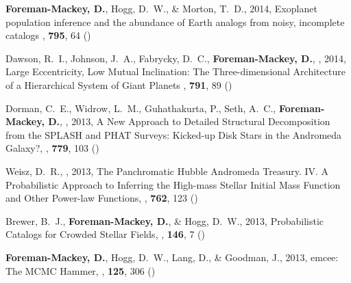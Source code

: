 \item {\bf Foreman-Mackey, D.}, Hogg, D.~W., \& Morton, T.~D., 2014,
        {Exoplanet population inference and the abundance of Earth analogs
         from noisy, incomplete catalogs}
    \apj, \textbf{795}, 64 ()

\item Dawson, R.~I., Johnson,  J.~A., Fabrycky, D.~C.,
    {\bf Foreman-Mackey, D.}, \etal, 2014,
        {Large Eccentricity, Low Mutual Inclination: The Three-dimensional
         Architecture of a Hierarchical System of Giant Planets}
    \apj, \textbf{791}, 89 ()

\item Dorman, C.~E., Widrow, L.~M., Guhathakurta, P., Seth, A.~C.,
    {\bf Foreman-Mackey, D.}, \etal, 2013,
        {A New Approach to Detailed Structural Decomposition from the SPLASH
         and PHAT Surveys: Kicked-up Disk Stars in the Andromeda Galaxy?},
    \apj, \textbf{779}, 103 ()

\item Weisz, D.~R., \etal, 2013,
        {The Panchromatic Hubble Andromeda Treasury. IV. A Probabilistic
         Approach to Inferring the High-mass Stellar Initial Mass Function and
         Other Power-law Functions},
    \apj, \textbf{762}, 123 ()

\item Brewer, B.~J., {\bf Foreman-Mackey, D.}, \& Hogg, D.~W., 2013,
        {Probabilistic Catalogs for Crowded Stellar Fields},
    \aj, \textbf{146}, 7 ()

\item {\bf Foreman-Mackey, D.}, Hogg, D.~W., Lang, D., \& Goodman, J., 2013,
        {emcee: The MCMC Hammer},
    \pasp, \textbf{125}, 306 ()
